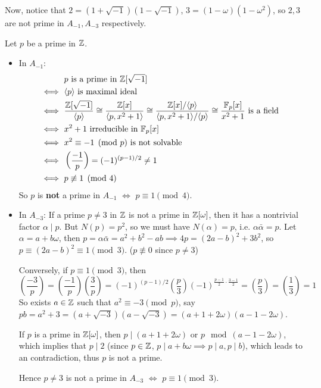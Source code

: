 Now, notice that $2 = (1 + \sqrt{-1})(1 - \sqrt{-1})$, $3 = (1 - \omega) (1 - \omega^2)$,
so $2, 3$ are not prime in $A_{-1}, A_{-3}$ respectively.

Let $p$ be a prime in $\mathbb{Z}$.
\begin{itemize}
  \item In $A_{-1}$:
    \begin{align*}
      & p \text{ is a prime in } \mathbb{Z}[\sqrt{-1}] \\
      \iff \ & \langle p\rangle \text{ is maximal ideal } \\
      \iff \ & \frac{\mathbb{Z}[\sqrt{-1}]}{\langle p\rangle} \cong \frac{\mathbb{Z}[x]}{\langle p, x^2+1\rangle}
      \cong \frac{\mathbb{Z}[x]/\langle p\rangle}{\langle p, x^2+1\rangle/\langle p\rangle} \cong \frac{\mathbb{F}_p[x]}{x^2+1}
      \text{ is a field } \\
      \iff \ & x^2 + 1 \text{ irreducible in } \mathbb{F}_p[x] \\
      \iff \ & x^2 \equiv -1 \pmod{p} \text{ is not solvable } \\
      \iff \ & \left(\frac{-1}{p}\right) = (-1)^{(p-1)/2} \neq 1 \\
      \iff \ & p \not\equiv 1 \pmod{4}
    \end{align*}
    So $p$ is {\bf not} a prime in $A_{-1}$ $\iff$ $p \equiv 1 \pmod{4}$.
  \item In $A_{-3}$: 
    If a prime $p \neq 3$ in $\mathbb{Z}$ is not a prime in $\mathbb{Z}[\omega]$, then it has
    a nontrivial factor $\alpha \mid p$. But $N(p) = p^2$, so 
    we must have $N(\alpha) = p$, i.e. $\alpha \bar{\alpha} = p$.
    Let $\alpha = a + b \omega$, then
    $p = \alpha \bar{\alpha} = a^2 + b^2 - ab \implies 4p = (2a - b)^2 + 3b^2$,
    so $p \equiv (2a - b)^2 \equiv 1 \pmod{3}$. ($p \not\equiv 0$ since $p \neq 3$)

    Conversely, if $p \equiv 1 \pmod{3}$, then
    \[ \left(\frac{-3}{p}\right)
      = \left(\frac{-1}{p}\right) \left(\frac{3}{p}\right)
      = (-1)^{(p-1)/2} \left(\frac{p}{3}\right) (-1)^{\frac{p-1}{2} \cdot \frac{3-1}{2}}
      = \left(\frac{p}{3}\right) = \left(\frac{1}{3}\right) = 1 \]
    So exists $a \in \mathbb{Z}$ such that $a^2 \equiv -3 \pmod{p}$,
    say $pb = a^2 + 3 = (a + \sqrt{-3}) (a - \sqrt{-3}) = (a+1 + 2\omega) (a - 1 - 2\omega)$.

    If $p$ is a prime in $\mathbb{Z}[\omega]$, then $p \mid (a+1+2\omega)$ or $p \mod (a - 1 - 2\omega)$,
    which implies that $p \mid 2$ (since $p \in \mathbb{Z}$, $p \mid a + b\omega \implies p \mid a, p \mid b$), 
    which leads to an contradiction,
    thus $p$ is not a prime.

    Hence $p \neq 3$ is not a prime in $A_{-3}$ $\iff$ $p \equiv 1 \pmod{3}$.
\end{itemize}


